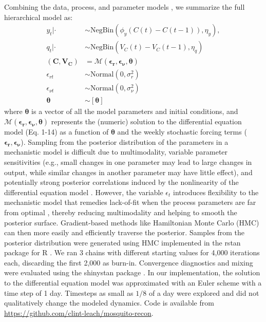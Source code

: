 \documentclass[10pt,letterpaper]{article}
\begin{document}
Combining the data, process, and parameter models \cite{Berliner1996}, we summarize the full hierarchical model as:
\begin{align}
y_t | \cdot & \sim \text{NegBin}(\phi_y (C(t) - C(t-1)), \eta_y),
\\
q_t | \cdot &\sim \text{NegBin}(V_{C}(t) - V_{C}(t-1), \eta_q)\\
(\mathbf{C}, \mathbf{V_C}) & = \mathcal{M}(\boldsymbol{\epsilon_r}, \boldsymbol{\epsilon_{\nu}},\boldsymbol{\theta})\\
\epsilon_{rt} & \sim \text{Normal}(0, \sigma^2_r)\\
\epsilon_{\nu t} & \sim \text{Normal}(0, \sigma^2_{\nu})\\
\boldsymbol{\theta} & \sim [\boldsymbol{\theta}]
\end{align}
where $\boldsymbol{\theta}$ is a vector of all the model parameters and initial conditions, and $\mathcal{M}(\boldsymbol{\epsilon_r}, \boldsymbol{\epsilon_{\nu}},\boldsymbol{\theta})$ represents the (numeric) solution to the differential equation model (Eq. 1-14) as a function of $\boldsymbol{\theta}$ and the weekly stochastic forcing terms ($\boldsymbol{\epsilon_{r}}, \boldsymbol{\epsilon_{\nu}}$).
Sampling from the posterior distribution of the parameters in a mechanistic model is difficult due to multimodality, variable parameter sensitivities (e.g., small changes in one parameter may lead to large changes in output, while similar changes in another parameter may have little effect), and potentially strong posterior correlations induced by the nonlinearity of the differential equation model \cite{Reilly2005, Girolami2008, Calderhead2011}.
However, the variable $\epsilon_t$ introduces flexibility to the mechanistic model that remedies lack-of-fit when the process parameters are far from optimal \cite{Leander2014}, thereby reducing multimodality and helping to smooth the posterior surface.
Gradient-based methods like Hamiltonian Monte Carlo (HMC) can then more easily and efficiently traverse the posterior.
Samples from the posterior distribution were generated using HMC implemented in the rstan package \cite{Carpenter2016, Rstan2017} for R \cite{R2016}. 
We ran 3 chains with different starting values for 4,000 iterations each, discarding the first 2,000 as burn-in.
Convergence diagnostics and mixing were evaluated using the shinystan package \cite{shinystan}.
In our implementation, the solution to the differential equation model was approximated with an Euler scheme with a time step of 1 day.  
Timesteps as small as $1/8$ of a day were explored and did not qualitatively change the modeled dynamics.
Code is available from \href{https://github.com/clint-leach/mosquito-recon}{https://github.com/clint-leach/mosquito-recon}.
\end{document}
